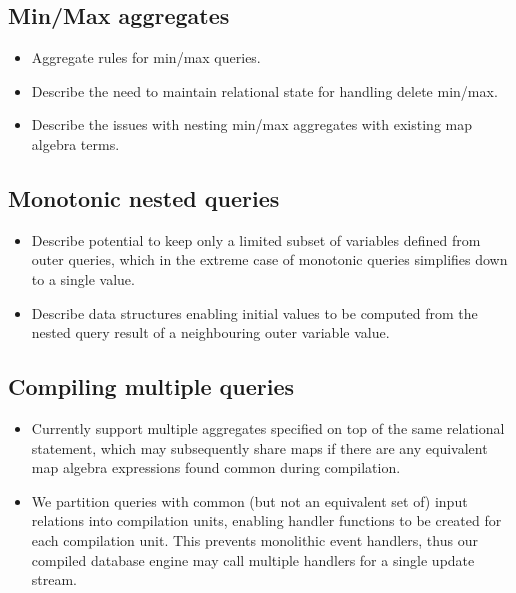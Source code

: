 \documentclass{sig-alternate}
\begin{document}
\subsection{Min/Max aggregates}
\begin{itemize}
\item Aggregate rules for min/max queries.
\item Describe the need to maintain relational state for handling delete min/max.
\item Describe the issues with nesting min/max aggregates with existing map
  algebra terms.
\end{itemize}

\subsection{Monotonic nested queries}
\begin{itemize}
\item Describe potential to keep only a limited subset of variables defined from
  outer queries, which in the extreme case of monotonic queries simplifies down
  to a single value.
\item Describe data structures enabling initial values to be computed from
  the nested query result of a neighbouring outer variable value.
\end{itemize}

\subsection{Compiling multiple queries}
\begin{itemize}
\item Currently support multiple aggregates specified on top of the same
  relational statement, which may subsequently share maps if there are any
  equivalent map algebra expressions found common during compilation.
\item We partition queries with common (but not an equivalent set of) input
  relations into compilation units, enabling handler functions to be created for
  each compilation unit. This prevents monolithic event handlers, thus our
  compiled database engine may call multiple handlers for a single update stream.
\end{itemize}


\end{document}
